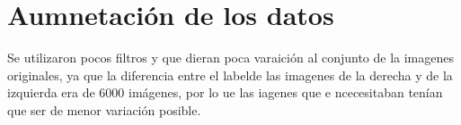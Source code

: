 \documentclass[12pt,a4paper]{report}
\begin{document}
\section{Aumnetación de los datos}
Se utilizaron pocos filtros y que dieran poca varaición al conjunto de la imagenes originales, ya que la diferencia entre el labelde las imagenes de la derecha y de la izquierda era de 6000 imágenes, por lo ue las iagenes que e ncecesitaban tenían que ser de menor variación posible.


\end{document}
